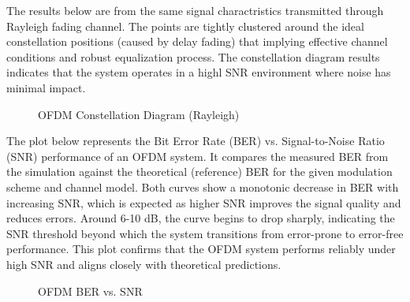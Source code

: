 \documentclass[conference]{IEEEtran}
\begin{document}
  The results below are from the same signal charactristics transmitted through Rayleigh fading channel. The points are tightly clustered around the ideal constellation positions (caused by delay fading) that implying effective channel conditions and robust equalization process. The constellation diagram results indicates that the system operates in a highl SNR environment where noise has minimal impact. 

	\begin{figure}[H]
		\centering
    		\caption{OFDM Constellation Diagram  (Rayleigh)}
  	  \end{figure}

The plot below represents the Bit Error Rate (BER) vs. Signal-to-Noise Ratio (SNR) performance of an OFDM system. It compares the measured BER from the simulation against the theoretical (reference) BER for the given modulation scheme and channel model. Both curves show a monotonic decrease in BER with increasing SNR, which is expected as higher SNR improves the signal quality and reduces errors. Around 6-10 dB, the curve begins to drop sharply, indicating the SNR threshold beyond which the system transitions from error-prone to error-free performance. This plot confirms that the OFDM system performs reliably under high SNR and aligns closely with theoretical predictions.
    
    \begin{figure}[H]
		\centering
    		\caption{OFDM BER vs. SNR}
  	  \end{figure}    
  	  
\end{document}
